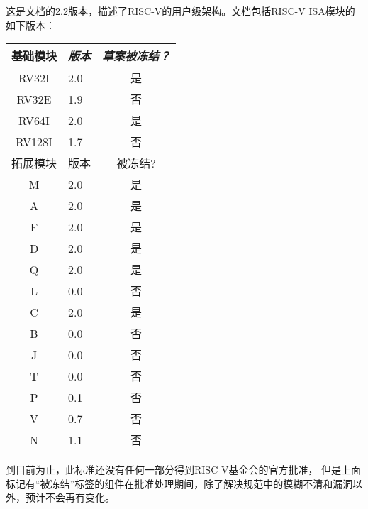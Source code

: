 这是文档的2.2版本，描述了RISC-V的用户级架构。文档包括RISC-V ISA模块的如下版本：
\begin{table}[hbt]
  \centering
  \begin{tabular}{|c|l|c|}
    \hline
    基础模块     & \em 版本 & \em 草案被冻结？ \\
    \hline
    RV32I    & 2.0 & 是 \\
    RV32E    & 1.9 & 否 \\
    RV64I    & 2.0 & 是 \\
    RV128I   & 1.7 & 否 \\
    \hline
    拓展模块 & 版本 & 被冻结? \\
    \hline
    M        & 2.0 & 是 \\
    A        & 2.0 & 是 \\
    F        & 2.0 & 是 \\
    D        & 2.0 & 是 \\
    Q        & 2.0 & 是 \\
    L        & 0.0 & 否 \\
    C        & 2.0 & 是 \\
    B        & 0.0 & 否 \\
    J        & 0.0 & 否 \\
    T        & 0.0 & 否 \\
    P        & 0.1 & 否 \\
    V        & 0.7 & 否 \\
    N        & 1.1 & 否 \\
    \hline
  \end{tabular}
\end{table}

到目前为止，此标准还没有任何一部分得到RISC-V基金会的官方批准，
但是上面标记有“被冻结”标签的组件在批准处理期间，除了解决规范中的模糊不清和漏洞以外，预计不会再有变化。

